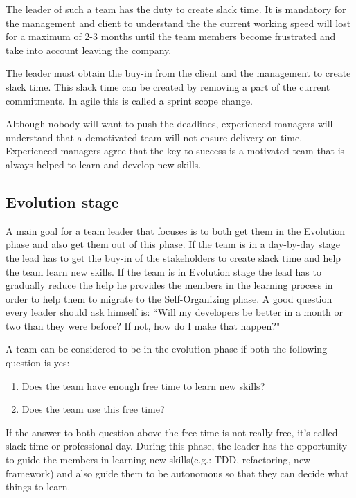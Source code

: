 The leader of such a team has the duty to create slack time. It is mandatory for the management and client to understand the the current working speed will lost for a maximum of 2-3 months until the team members become frustrated and take into account leaving the company.

The leader must obtain the buy-in from the client and the management to create slack time. This slack time can be created by removing a part of the current commitments. In agile this is called a sprint scope change.

Although nobody will want to push the deadlines, experienced managers will understand that a demotivated team will not ensure delivery on time. Experienced managers agree that the key to success is a motivated team that is always helped to learn and develop new skills.

\subsection{Evolution stage}
A main goal for a team leader that focuses is to both get them in the Evolution phase and also get them out of this phase. If the team is in a day-by-day stage the lead has to get the buy-in of the stakeholders to create slack time and help the team learn new skills. If the team is in Evolution stage the lead has to gradually reduce the help he provides the members in the learning process in order to help them to migrate to the Self-Organizing phase. A good question every leader should ask himself is: ``Will my developers be better in a month or two than they were before? If not, how do I make that happen?"\cite{notes-to-a-software-team-leader}

A team can be considered to be in the evolution phase if both the following question is yes:
\begin{enumerate}
\item Does the team have enough free time to learn new skills?
\item Does the team use this free time?
\end{enumerate}
If the answer to both question above the free time is not really free, it's called slack time or professional day. 
During this phase, the leader has the opportunity to guide the members in learning new skills(e.g.: TDD, refactoring, new framework) and also 
guide them to be autonomous so that they can decide what things to learn.

